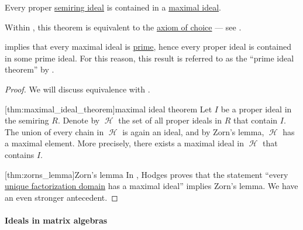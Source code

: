 \begin{theorem}\label{thm:maximal_ideal_theorem}
  Every proper \hyperref[def:semiring_ideal]{semiring ideal} is contained in a \hyperref[def:semiring_ideal/maximal]{maximal ideal}.
\end{theorem}
\begin{comments}
  \item Within \hyperref[def:zfc]{}, this theorem is equivalent to the \hyperref[def:zfc/choice]{axiom of choice} --- see .

  \item {} implies that every maximal ideal is \hyperref[def:semiring_ideal/prime]{prime}, hence every proper ideal is contained in some prime ideal. For this reason, this result is referred to as the \enquote{prime ideal theorem} by .
\end{comments}
\begin{proof}
  We will discuss equivalence with .

  [thm:maximal_ideal_theorem]{maximal ideal theorem} Let \( I \) be a proper ideal in the semiring \( R \). Denote by \( \mscrH \) the set of all proper ideals in \( R \) that contain \( I \). The union of every chain in \( \mscrH \) is again an ideal, and by Zorn's lemma, \( \mscrH \) has a maximal element. More precisely, there exists a maximal ideal in \( \mscrH \) that contains \( I \).

  [thm:zorns_lemma]{Zorn's lemma} In \cite{Hodges1979}, Hodges proves that the statement \enquote{every \hyperref[def:unique_factorization_domain]{unique factorization domain} has a maximal ideal} implies Zorn's lemma. We have an even stronger antecedent.
\end{proof}

\paragraph{Ideals in matrix algebras}

